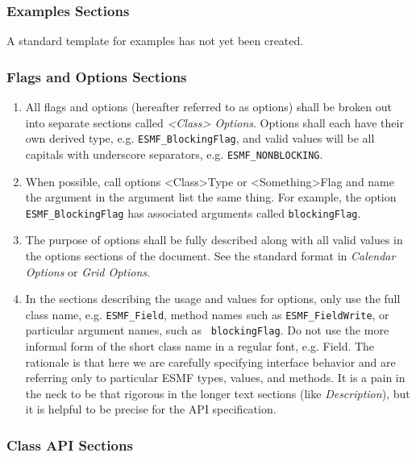 \subsubsection{Examples Sections}

A standard template for examples has not yet been created.

\subsubsection{Flags and Options Sections}

\begin{enumerate}
\item All flags and options (hereafter referred to as options) 
shall be broken out into separate sections called {\it <Class> Options}.  
Options shall each have their own derived type, 
e.g. {\tt ESMF\_BlockingFlag}, and valid values will be all capitals
with underscore separators, e.g. {\tt ESMF\_NONBLOCKING}.

\item When possible, call options <Class>Type or <Something>Flag and
name the argument in the argument list the same thing.  For example,
the option {\tt ESMF\_BlockingFlag} has associated arguments 
called {\tt blockingFlag}.

\item The purpose of options shall be fully described along with all 
valid values in the options sections of the document.  See the
standard format in {\it Calendar Options} or {\it Grid Options}.

\item In the sections describing the usage and values for options, 
only use the full class name, e.g. {\tt ESMF\_Field}, method names such
as {\tt ESMF\_FieldWrite}, or particular argument names, such as {\tt
blockingFlag}. Do not use the more informal form of the short class
name in a regular font, e.g. Field.  The rationale is that here we 
are carefully specifying interface behavior and are referring only 
to particular ESMF types, values, and methods.  It is a pain in 
the neck to be that rigorous in the longer text sections 
(like {\it Description}), but it is helpful to be precise for the 
API specification.
\end{enumerate}

\subsubsection{Class API Sections}

